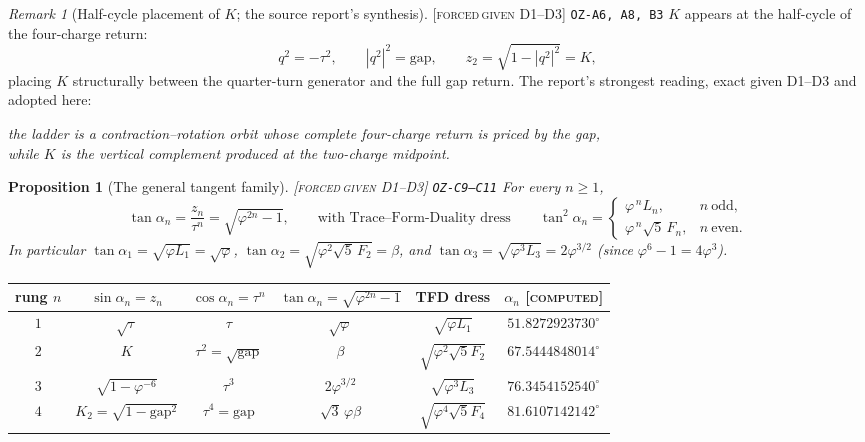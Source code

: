 \documentclass[11pt]{article}
\newcommand{\tagFD}{\textcolor{cF}{\textsc{[forced}}\,\textcolor{cD}{\textsc{given D1--D3]}}}
\newcommand{\tagC}{\textcolor{cC}{\textsc{[computed]}}}
\newcommand{\hx}[1]{\textcolor{cC}{\footnotesize\texttt{#1}}}
\newcommand{\gp}{\varphi}
\newcommand{\gapc}{\mathrm{gap}}
\theoremstyle{plain}
\newtheorem{proposition}[theorem]{Proposition}
\theoremstyle{definition}
\theoremstyle{remark}
\newtheorem{remark}[theorem]{Remark}
\begin{document}
\begin{remark}[Half-cycle placement of $K$; the source report's synthesis]\label{rem:halfcycle}\tagFD{} \hx{OZ-A6, A8, B3}
$K$ appears at the half-cycle of the four-charge return:
\[
q^2=-\tau^2,\qquad |q^2|^2=\gapc,\qquad z_2=\sqrt{1-|q^2|^2}=K ,
\]
placing $K$ structurally between the quarter-turn generator and the full gap
return. The report's strongest reading, exact given D1--D3 and adopted here:
\begin{center}
\emph{the ladder is a contraction--rotation orbit whose complete four-charge
return is priced by the gap,\\ while $K$ is the vertical complement produced
at the two-charge midpoint.}
\end{center}
\end{remark}

\begin{proposition}[The general tangent family]\label{prop:tangents}\tagFD{} \hx{OZ-C9--C11}
For every $n\ge1$,
\[
\tan\alpha_n=\frac{z_n}{\tau^n}=\sqrt{\gp^{2n}-1},
\qquad\text{with Trace--Form-Duality dress}\qquad
\tan^2\alpha_n=\begin{cases}\gp^{\,n}L_n,& n\ \text{odd},\\[2pt]
\gp^{\,n}\sqrt5\,F_n,& n\ \text{even}.\end{cases}
\]
In particular $\tan\alpha_1=\sqrt{\gp L_1}=\sqrt\gp$,
$\tan\alpha_2=\sqrt{\gp^2\sqrt5\,F_2}=\beta$, and
$\tan\alpha_3=\sqrt{\gp^3L_3}=2\gp^{3/2}$ (since $\gp^6-1=4\gp^3$).
\end{proposition}

\begin{center}\small
\begin{tabular}{@{}cccccc@{}}
\toprule
rung $n$ & $\sin\alpha_n=z_n$ & $\cos\alpha_n=\tau^n$ & $\tan\alpha_n=\sqrt{\gp^{2n}-1}$ & TFD dress & $\alpha_n$ \tagC{}\\
\midrule
$1$ & $\sqrt\tau$ & $\tau$ & $\sqrt\gp$ & $\sqrt{\gp L_1}$ & $51.8272923730^\circ$\\
$2$ & $K$ & $\tau^2=\sqrt{\gapc}$ & $\beta$ & $\sqrt{\gp^2\sqrt5F_2}$ & $67.5444848014^\circ$\\
$3$ & $\sqrt{1-\gp^{-6}}$ & $\tau^3$ & $2\gp^{3/2}$ & $\sqrt{\gp^3L_3}$ & $76.3454152540^\circ$\\
$4$ & $K_2=\sqrt{1-\gapc^2}$ & $\tau^4=\gapc$ & $\sqrt3\,\gp\beta$ & $\sqrt{\gp^4\sqrt5F_4}$ & $81.6107142142^\circ$\\
\bottomrule
\end{tabular}
\end{center}
\end{document}
